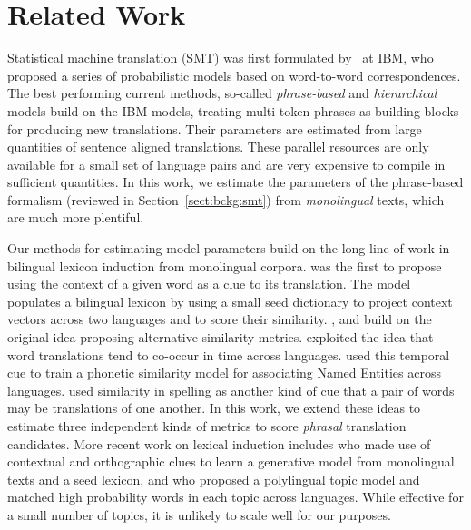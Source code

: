 \documentclass[11pt]{article}
\newcommand{\mtodo}[1]{}
\newcommand{\secref}[1]{Section~\ref{#1}}
\begin{document}


\section{Related Work} \label{sect:related-work}

Statistical machine translation (SMT) was first formulated by~ at IBM, who proposed a series of probabilistic models based on word-to-word correspondences.  The best performing current methods, so-called {\em phrase-based} and {\em hierarchical} models \cite{Och:2002,Koehn:2003,Chiang:2005} build on the IBM models, treating multi-token phrases as building blocks for producing new translations.  Their parameters are estimated from large quantities of sentence aligned translations.
These parallel resources are only available for a small set of language pairs and are very expensive to compile in sufficient quantities.  
In this work, we estimate the parameters of the phrase-based formalism (reviewed in \secref{sect:bckg:smt}) from {\em monolingual} texts, which are much more plentiful. \nocite{Munteanu:2006,Smith2010,Uszkoreit:2010}

Our methods for estimating model parameters build on the long line of work in bilingual lexicon induction from monolingual corpora.  was the first to propose using the context of a given word as a clue to its translation.  The model populates a bilingual lexicon by using a small seed dictionary to project context vectors across two languages and to score their similarity. , and  build on the original idea proposing alternative similarity metrics.  exploited the idea that word translations tend to co-occur in time across languages.  used this temporal cue to train a phonetic similarity model for associating Named Entities across languages.   used similarity in spelling as another kind of cue that a pair of words may be translations of one another.  In this work, we extend these ideas to estimate three independent kinds of metrics to score {\em phrasal} translation candidates.  More recent work on lexical induction includes  who made use of contextual and orthographic clues to learn a generative model from monolingual texts and a seed lexicon, and  who proposed a polylingual topic model and matched high probability words in each topic across languages.  While effective for a small number of topics, it is unlikely to scale well for our purposes. %
\end{document}
